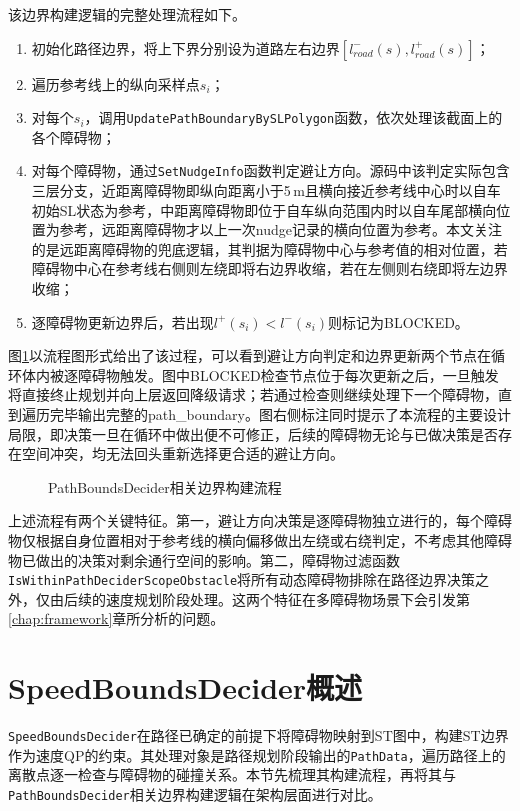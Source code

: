 该边界构建逻辑的完整处理流程如下。
\begin{enumerate}
\item 初始化路径边界，将上下界分别设为道路左右边界$[l_{road}^-(s), l_{road}^+(s)]$；
\item 遍历参考线上的纵向采样点$s_i$；
\item 对每个$s_i$，调用\texttt{UpdatePathBoundaryBySLPolygon}函数，依次处理该截面上的各个障碍物；
\item 对每个障碍物，通过\texttt{SetNudgeInfo}函数判定避让方向。源码中该判定实际包含三层分支，近距离障碍物即纵向距离小于5\,m且横向接近参考线中心时以自车初始SL状态为参考，中距离障碍物即位于自车纵向范围内时以自车尾部横向位置为参考，远距离障碍物才以上一次nudge记录的横向位置为参考。本文关注的是远距离障碍物的兜底逻辑，其判据为障碍物中心与参考值的相对位置，若障碍物中心在参考线右侧则左绕即将右边界收缩，若在左侧则右绕即将左边界收缩；
\item 逐障碍物更新边界后，若出现$l^+(s_i) < l^-(s_i)$则标记为BLOCKED。
\end{enumerate}

图\ref{fig:path_bounds_flow}以流程图形式给出了该过程，可以看到避让方向判定和边界更新两个节点在循环体内被逐障碍物触发。图中BLOCKED检查节点位于每次更新之后，一旦触发将直接终止规划并向上层返回降级请求；若通过检查则继续处理下一个障碍物，直到遍历完毕输出完整的path\_boundary。图右侧标注同时提示了本流程的主要设计局限，即决策一旦在循环中做出便不可修正，后续的障碍物无论与已做决策是否存在空间冲突，均无法回头重新选择更合适的避让方向。

\begin{figure}[htbp]
\centering
{}
\caption{PathBoundsDecider相关边界构建流程}
\label{fig:path_bounds_flow}
\end{figure}

上述流程有两个关键特征。第一，避让方向决策是逐障碍物独立进行的，每个障碍物仅根据自身位置相对于参考线的横向偏移做出左绕或右绕判定，不考虑其他障碍物已做出的决策对剩余通行空间的影响。第二，障碍物过滤函数\texttt{IsWithinPathDeciderScopeObstacle}将所有动态障碍物排除在路径边界决策之外，仅由后续的速度规划阶段处理。这两个特征在多障碍物场景下会引发第\ref{chap:framework}章所分析的问题。

\section{SpeedBoundsDecider概述}

\texttt{SpeedBoundsDecider}在路径已确定的前提下将障碍物映射到ST图中，构建ST边界作为速度QP的约束。其处理对象是路径规划阶段输出的\texttt{PathData}，遍历路径上的离散点逐一检查与障碍物的碰撞关系。本节先梳理其构建流程，再将其与\texttt{PathBoundsDecider}相关边界构建逻辑在架构层面进行对比。

